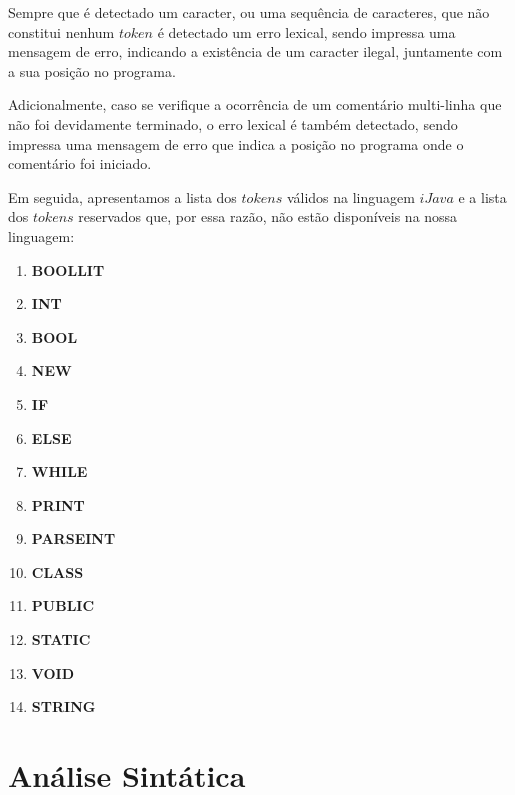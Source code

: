 \documentclass[11pt,a4paper]{article}
\begin{document}
Sempre que é detectado um caracter, ou uma sequência de caracteres, que não constitui nenhum $token$ é detectado um erro lexical, sendo impressa uma mensagem de erro, indicando a existência de um caracter ilegal, juntamente com a sua posição no programa.

Adicionalmente, caso se verifique a ocorrência de um comentário multi-linha que não foi devidamente terminado, o erro lexical é também detectado, sendo impressa uma mensagem de erro que indica a posição no programa onde o comentário foi iniciado.

Em seguida, apresentamos a lista dos $tokens$ válidos na linguagem $iJava$ e a lista dos $tokens$ reservados que, por essa razão, não estão disponíveis na nossa linguagem:

\begin{enumerate}
\item \textbf{BOOLLIT}

\item \textbf{INT}

\item \textbf{BOOL}

\item \textbf{NEW}

\item \textbf{IF}

\item \textbf{ELSE}

\item \textbf{WHILE}

\item \textbf{PRINT}

\item \textbf{PARSEINT}

\item \textbf{CLASS}

\item \textbf{PUBLIC}

\item \textbf{STATIC}

\item \textbf{VOID}

\item \textbf{STRING}
\end{enumerate}


\pagebreak

\section{Análise Sintática}
\end{document}

